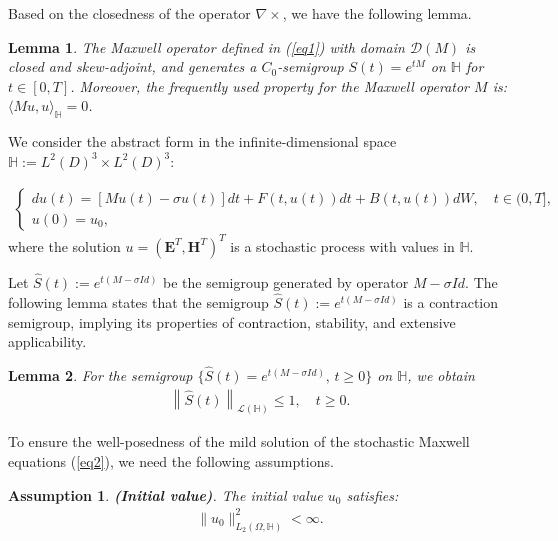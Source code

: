 \documentclass[preprint,12pt]{elsarticle}
\newtheorem{lemma}{Lemma}%
\newtheorem{assumption}{Assumption}
\begin{document}
	Based on the closedness of the operator \( \nabla \times \), we have the following lemma.
	
	\begin{lemma}\label{lemma1} \citep{Chenetal2023}
		The Maxwell operator defined in (\ref{eq1}) with domain \( \mathcal{D}(M) \) is closed and skew-adjoint, and generates a \( C_0 \)-semigroup \( S(t) = e^{tM} \) on \( \mathbb{H} \) for \( t \in [0,T] \). Moreover, the frequently used property for the Maxwell operator \( M \) is: \( \langle M u, u \rangle_{\mathbb{H}} = 0 \).
	\end{lemma}
	
	We consider the abstract form in the infinite-dimensional space \( \mathbb{H} := L^2(D)^3 \times L^2(D)^3 \):
	
	\begin{align}
		\label{eq2}
		\left\{
		\begin{array}{ll}
			d u(t) = [M u(t) - \sigma u(t)] dt + F(t,u(t)) dt + B(t,u(t)) dW, \quad t \in (0,T], \\
			u(0) = u_0,
		\end{array}
		\right.
	\end{align}
	where the solution \( u = (\bm{E}^T, \bm{H}^T)^T \) is a stochastic process with values in \( \mathbb{H} \).
	
	Let $\widehat S(t):=e^{ t(M-\sigma Id)}$ be the semigroup generated by operator $M-\sigma Id$. The following lemma states that the semigroup $\widehat S(t):=e^{ t(M-\sigma Id)}$ is a contraction semigroup, implying its properties of contraction, stability, and extensive applicability.
	\begin{lemma}\label{lemma2}
		For the semigroup $\{\widehat S(t)=e^{ t(M-\sigma Id)}, \, t\geq 0\}$ on $\mathbb{H}$, we obtain
		\begin{align*}
			\left\|\widehat S(t)\right\|_{\mathcal{L(\mathbb{H})}}\leq 1, \quad t \geq 0.
		\end{align*}	
	\end{lemma}
	To ensure the well-posedness of the mild solution of the stochastic Maxwell equations (\ref{eq2}), we need the following assumptions.
	
	\begin{assumption}\label{assump1}{\bf(Initial value)}.
		The initial value \( u_0 \) satisfies:
		\begin{align*}
			\|u_0\|^2_{L_2(\Omega, \mathbb{H})} < \infty.
		\end{align*}
	\end{assumption}
	
\end{document}
